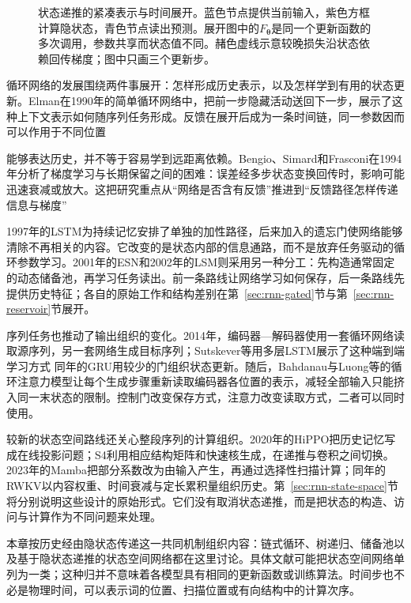 \begin{figure}[htb]
  \centering
  
  \caption{状态递推的紧凑表示与时间展开。蓝色节点提供当前输入，紫色方框计算隐状态，青色节点读出预测。展开图中的$F_{\bm{\theta}}$是同一个更新函数的多次调用，参数共享而状态值不同。赭色虚线示意较晚损失沿状态依赖回传梯度；图中只画三个更新步。}
  \label{fig:rnn-unrolling}
\end{figure}

循环网络的发展围绕两件事展开：怎样形成历史表示，以及怎样学到有用的状态更新。Elman在1990年的简单循环网络中，把前一步隐藏活动送回下一步，展示了这种上下文表示如何随序列任务形成。反馈在展开后成为一条时间链，同一参数因而可以作用于不同位置

能够表达历史，并不等于容易学到远距离依赖。Bengio、Simard和Frasconi在1994年分析了梯度学习与长期保留之间的困难：误差经多步状态变换回传时，影响可能迅速衰减或放大。这把研究重点从“网络是否含有反馈”推进到“反馈路径怎样传递信息与梯度”

1997年的LSTM为持续记忆安排了单独的加性路径，后来加入的遗忘门使网络能够清除不再相关的内容。它改变的是状态内部的信息通路，而不是放弃任务驱动的循环参数学习。2001年的ESN和2002年的LSM则采用另一种分工：先构造通常固定的动态储备池，再学习任务读出。前一条路线让网络学习如何保存，后一条路线先提供历史特征；各自的原始工作和结构差别在第~\ref{sec:rnn-gated}节与第~\ref{sec:rnn-reservoir}节展开。

序列任务也推动了输出组织的变化。2014年，编码器—解码器使用一套循环网络读取源序列，另一套网络生成目标序列；Sutskever等用多层LSTM展示了这种端到端学习方式 同年的GRU用较少的门组织状态更新。随后，Bahdanau与Luong等的循环注意力模型让每个生成步骤重新读取编码器各位置的表示，减轻全部输入只能挤入同一末状态的限制。控制门改变保存方式，注意力改变读取方式，二者可以同时使用。

较新的状态空间路线还关心整段序列的计算组织。2020年的HiPPO把历史记忆写成在线投影问题；S4利用相应结构矩阵和快速核生成，在递推与卷积之间切换。2023年的Mamba把部分系数改为由输入产生，再通过选择性扫描计算；同年的RWKV以内容权重、时间衰减与定长累积量组织历史。第~\ref{sec:rnn-state-space}节将分别说明这些设计的原始形式。它们没有取消状态递推，而是把状态的构造、访问与计算作为不同问题来处理。

本章按历史经由隐状态传递这一共同机制组织内容：链式循环、树递归、储备池以及基于隐状态递推的状态空间网络都在这里讨论。具体文献可能把状态空间网络单列为一类；这种归并不意味着各模型具有相同的更新函数或训练算法。时间步也不必是物理时间，可以表示词的位置、扫描位置或有向结构中的计算次序。

